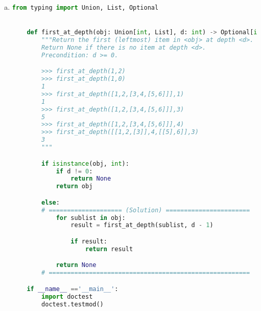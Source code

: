 \documentclass[12pt]{article}
\begin{document}
\begin{enumerate}[a.]
\begin{mdframed}
    \end{mdframed}

    \item

    \begin{lstlisting}[language=python,caption={worksheet\_16\_q2c\_solution.py}]
    from typing import Union, List, Optional


    def first_at_depth(obj: Union[int, List], d: int) -> Optional[int]:
        """Return the first (leftmost) item in <obj> at depth <d>.
        Return None if there is no item at depth <d>.
        Precondition: d >= 0.

        >>> first_at_depth(1,2)
        >>> first_at_depth(1,0)
        1
        >>> first_at_depth([1,2,[3,4,[5,6]]],1)
        1
        >>> first_at_depth([1,2,[3,4,[5,6]]],3)
        5
        >>> first_at_depth([1,2,[3,4,[5,6]]],4)
        >>> first_at_depth([[1,2,[3]],4,[[5],6]],3)
        3
        """

        if isinstance(obj, int):
            if d != 0:
                return None
            return obj

        else:
        # ==================== (Solution) =======================
            for sublist in obj:
                result = first_at_depth(sublist, d - 1)

                if result:
                    return result

            return None
        # =======================================================

    if __name__ =='__main__':
        import doctest
        doctest.testmod()
    \end{lstlisting}


\end{enumerate}
\end{document}

